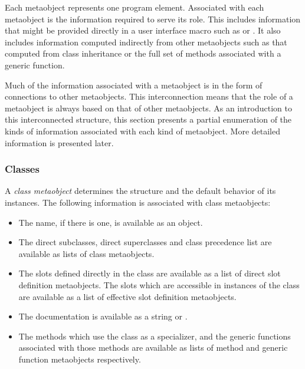 Each metaobject represents one program element. Associated with each metaobject
is the information required to serve its role. This includes information that
might be provided directly in a user interface macro such as  or
. It also includes information computed indirectly from other
metaobjects such as that computed from class inheritance or the full set of
methods associated with a generic function. 

Much of the information associated with a metaobject is in the form of
connections to other metaobjects. This interconnection means that the role of a
metaobject is always based on that of other metaobjects. As an introduction to
this interconnected structure, this section presents a partial enumeration of
the kinds of information associated with each kind of metaobject. More detailed
information is presented later. 

\subsubsection{Classes}

A \emph{class metaobject} determines the structure and the default behavior of its
instances. The following information is associated with class metaobjects: 


  \begin{itemize}
  \item 
    The name, if there is one, is available as an object.

  \item 
    The direct subclasses, direct superclasses and class precedence list are
    available as lists of class metaobjects. 

  \item 
    The slots defined directly in the class are available as a list of direct
    slot definition metaobjects. The slots which are accessible in instances of
    the class are available as a list of effective slot definition metaobjects.

  \item 
    The documentation is available as a string or .

  \item 
    The methods which use the class as a specializer, and the generic functions
    associated with those methods are available as lists of method and generic
    function metaobjects respectively. 
  \end{itemize}


